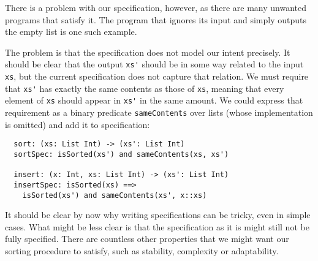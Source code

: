 There is a problem with our specification, however, as there are many unwanted
programs that satisfy it. The program that ignores its input and simply outputs
the empty list is one such example.



The problem is that the specification does not model our intent precisely. It
should be clear that the output \lstinline{xs'} should be in some way related to
the input \lstinline{xs}, but the current specification does not capture that
relation. We must require that \lstinline{xs'} has exactly the same contents as
those of \lstinline{xs}, meaning that every element of \lstinline{xs} should
appear in \lstinline{xs'} in the same amount. We could express that requirement
as a binary predicate \lstinline{sameContents} over lists (whose implementation
is omitted) and add it to specification:

\begin{lstlisting}
  sort: (xs: List Int) -> (xs': List Int)
  sortSpec: isSorted(xs') and sameContents(xs, xs')

  insert: (x: Int, xs: List Int) -> (xs': List Int)
  insertSpec: isSorted(xs) ==>
    isSorted(xs') and sameContents(xs', x::xs)
\end{lstlisting}

It should be clear by now why writing specifications can be tricky, even in
simple cases. What might be less clear is that the specification as it is might
still not be fully specified. There are countless other properties that we might
want our sorting procedure to satisfy, such as stability, complexity or
adaptability.



